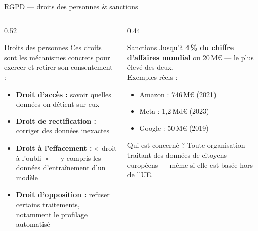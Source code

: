 \documentclass[aspectratio=169, 10pt]{beamer}
\begin{document}
\begin{frame}{RGPD --- droits des personnes \& sanctions}
  \begin{columns}[T]
    \begin{column}{0.52\textwidth}
      \begin{exampleblock}{Droits des personnes}
        Ces droits sont les mécanismes concrets
        pour exercer et retirer son consentement :
        \begin{itemize}
          \item \textbf{Droit d'accès :} savoir quelles
                données on détient sur eux
          \item \textbf{Droit de rectification :}
                corriger des données inexactes
          \item \textbf{Droit à l'effacement :}
                «~droit à l'oubli~» — y compris
                les données d'entraînement d'un modèle
          \item \textbf{Droit d'opposition :}
                refuser certains traitements,
                notamment le profilage automatisé
        \end{itemize}
      \end{exampleblock}
    \end{column}
    \begin{column}{0.44\textwidth}
      \begin{alertblock}{Sanctions}
        Jusqu'à \textbf{4\,\% du chiffre d'affaires mondial}
        ou 20\,M€ — le plus élevé des deux.\\[4pt]
        Exemples réels :
        \begin{itemize}
          \item Amazon : 746\,M€ (2021)
          \item Meta : 1,2\,Md€ (2023)
          \item Google : 50\,M€ (2019)
        \end{itemize}
      \end{alertblock}
      \smallskip
      \begin{block}{Qui est concerné ?}
        Toute organisation traitant des données
        de citoyens européens — même si elle
        est basée hors de l'UE.
      \end{block}
    \end{column}
  \end{columns}
\end{frame}
\end{document}
